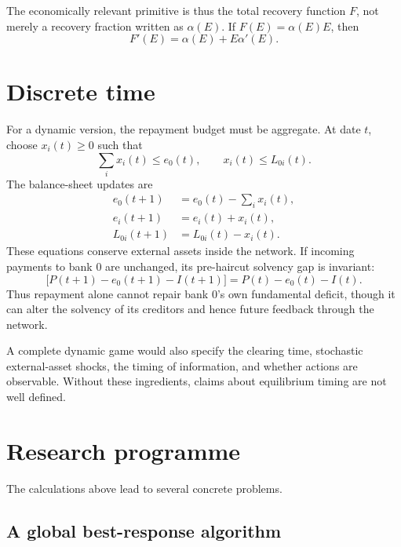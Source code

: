 \documentclass[11pt]{article}
\theoremstyle{definition}
\theoremstyle{remark}
\begin{document}
The economically relevant primitive is thus the total recovery function $F$,
not merely a recovery fraction written as $\alpha(E)$.  If
$F(E)=\alpha(E)E$, then
\begin{equation}
  F'(E)=\alpha(E)+E\alpha'(E).
\end{equation}

\section{Discrete time}

For a dynamic version, the repayment budget must be aggregate.  At date $t$,
choose $x_i(t)\geq0$ such that
\begin{equation}
  \sum_i x_i(t)\leq e_0(t),
  \qquad
  x_i(t)\leq L_{0i}(t).
\end{equation}
The balance-sheet updates are
\begin{align}
  e_0(t+1)&=e_0(t)-\sum_i x_i(t),\\
  e_i(t+1)&=e_i(t)+x_i(t),\\
  L_{0i}(t+1)&=L_{0i}(t)-x_i(t).
\end{align}
These equations conserve external assets inside the network.  If incoming
payments to bank $0$ are unchanged, its pre-haircut solvency gap is invariant:
\begin{equation}
  \bigl[P(t+1)-e_0(t+1)-I(t+1)\bigr]
  =P(t)-e_0(t)-I(t).
\end{equation}
Thus repayment alone cannot repair bank $0$'s own fundamental deficit, though
it can alter the solvency of its creditors and hence future feedback through
the network.

A complete dynamic game would also specify the clearing time, stochastic
external-asset shocks, the timing of information, and whether actions are
observable.  Without these ingredients, claims about equilibrium timing are
not well defined.

\section{Research programme}

The calculations above lead to several concrete problems.

\subsection{A global best-response algorithm}
\end{document}
